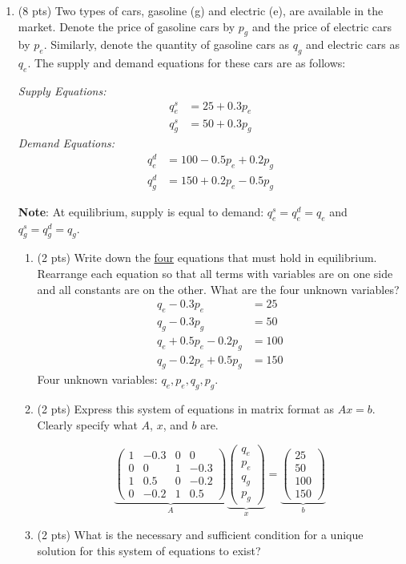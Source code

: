 \documentclass{./../../latex/tests}
\begin{document}
\begin{enumerate}
\begin{enumerate}
\end{enumerate}

\newpage
\item (8 pts) Two types of cars, gasoline (g) and electric (e), are available in the market. Denote the price of gasoline cars by \(p_g\) and the price of electric cars by \(p_e\). Similarly, denote the quantity of gasoline cars as \(q_g\) and electric cars as \(q_e\). The supply and demand equations for these cars are as follows:

\textit{Supply Equations:}
\begin{align*}
q^s_e &= 25 + 0.3p_e \\
q^s_g &= 50 + 0.3p_g
\end{align*}
\textit{Demand Equations:}
\begin{align*}
q^d_e &= 100 - 0.5p_e + 0.2p_g \\
q^d_g &= 150 + 0.2p_e - 0.5p_g
\end{align*}

\textbf{Note}: At equilibrium, supply is equal to demand: \(q^s_e = q^d_e = q_e\) and \(q^s_g = q^d_g = q_g\).

\begin{enumerate}
\item (2 pts) Write down the \underline{four} equations that must hold in equilibrium. Rearrange each equation so that all terms with variables are on one side and all constants are on the other. What are the four unknown variables?
\begin{align}
q_e-0.3p_e &= 25  \\
q_g - 0.3p_g &= 50  \\
q_e + 0.5p_e - 0.2p_g &= 100  \\
q_g - 0.2p_e + 0.5p_g &= 150 
\end{align}
Four unknown variables: $q_e, p_e, q_g, p_g$. \\
\item (2 pts) Express this system of equations in matrix format as \(Ax = b\). Clearly specify what \(A\), \(x\), and \(b\) are.

\[
\underbrace{\begin{pmatrix}
1 & -0.3 & 0 & 0 \\
0 & 0 & 1 & -0.3 \\
1 & 0.5 & 0 & -0.2 \\
0 & -0.2 & 1 & 0.5
\end{pmatrix}}_{A} 
\underbrace{\begin{pmatrix}
q_e \\
p_e \\
q_g \\
p_g
\end{pmatrix}}_{x}
=
\underbrace{\begin{pmatrix}
25 \\
50 \\
100 \\
150
\end{pmatrix}}_{b}
\]
\item (2 pts) What is the necessary and sufficient condition for a unique solution for this system of equations to exist? 


\end{enumerate}
\end{enumerate}
\end{document}
